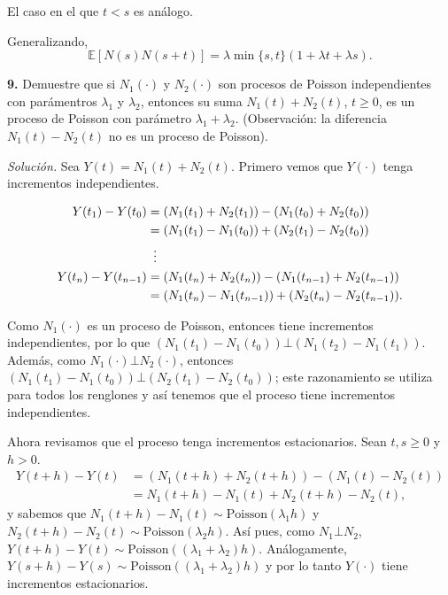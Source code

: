 \documentclass[12pt]{article}
\newcommand{\E}{\mathbb{E}}
\begin{document}
El caso en el que $t < s$ es análogo.

Generalizando, 
\[\E[N(s)N(s+t)] = \lambda  \min\{s,t\}(1 + \lambda t + \lambda s). \]

\begin{tcolorbox}[colback=blue!5!white, colframe=blue!5!white, arc=0mm, boxrule=0pt]
\textbf{9.} Demuestre que si $N_1(\cdot)$ y $N_2(\cdot)$ son procesos de Poisson independientes con parámentros $\lambda_1$ y $\lambda_2$, entonces su suma $N_1(t) + N_2(t)$, $t\geq 0$, es un proceso de Poisson con parámetro $\lambda_1 + \lambda_2$. (Observación: la diferencia $N_1(t) - N_2(t)$ no es un proceso de Poisson).
\end{tcolorbox}

\textit{Solución.} Sea $Y(t) = N_1(t) + N_2(t)$. Primero vemos que $Y(\cdot)$ tenga incrementos independientes.

\begin{align*}
    Y(t_1) - Y(t_0) &= (N_1(t_1) + N_2(t_1)) - (N_1(t_0) + N_2(t_0)) \\
    &= (N_1(t_1) - N_1(t_0)) + (N_2(t_1) - N_2(t_0)) \\
    &\vdotswithin{=} \notag \\
    Y(t_n) - Y(t_{n-1}) &= (N_1(t_n) + N_2(t_n)) - (N_1(t_{n-1}) + N_2(t_{n-1})) \\
    &= (N_1(t_n) - N_1(t_{n-1})) + (N_2(t_n) - N_2(t_{n-1})).
\end{align*}

Como $N_1(\cdot)$ es un proceso de Poisson, entonces tiene incrementos independientes, por lo que $(N_1(t_1) - N_1(t_{0})) \bot (N_1(t_2) - N_1(t_{1}))$. Además, como $N_1(\cdot) \bot N_2(\cdot)$, entonces $(N_1(t_1) - N_1(t_{0})) \bot (N_2(t_1) - N_2(t_{0}))$; este razonamiento se utiliza para todos los renglones y así tenemos que el proceso tiene incrementos independientes.

Ahora revisamos que el proceso tenga incrementos estacionarios. Sean $t,s \geq 0$ y $h>0$.
\begin{align*}
    Y(t+h) - Y(t) &= (N_1(t+h)+N_2(t+h)) - (N_1(t)-N_2(t)) \\
    &= N_1(t+h)-N_1(t) + N_2(t+h)-N_2(t),
\end{align*}
y sabemos que $N_1(t+h)-N_1(t) \sim \textrm{Poisson}(\lambda_1 h)$ y $N_2(t+h)-N_2(t)\sim \textrm{Poisson}(\lambda_2 h)$. Así pues, como $N_1 \bot N_2$, $Y(t+h) - Y(t) \sim \textrm{Poisson}((\lambda_1 + \lambda_2) h)$. Análogamente, $Y(s+h) - Y(s) \sim \textrm{Poisson}((\lambda_1 + \lambda_2) h)$ y por lo tanto $Y(\cdot)$ tiene incrementos estacionarios.
\end{document}
